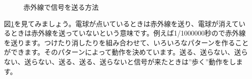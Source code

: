 \documentclass[text05.tex]{subfiles}
\begin{document}
\begin{figure}[H]
\centering

\caption{赤外線で信号を送る方法}
\label{ir}
\end{figure}

図\ref{ir}を見てみましょう。電球が点いているときは赤外線を送り、電球が消えているときは赤外線を送っていないという意味です。例えば1/1000000秒ので赤外線を送ります。つけたり消したりを組み合わせて、いろいろなパターンを作ることができます。そのパターンによって動作を決めています。送る、送らない、送らない、送らない、送る、送る、送らないと信号が来たときは”歩く”動作をします。
\end{document}
